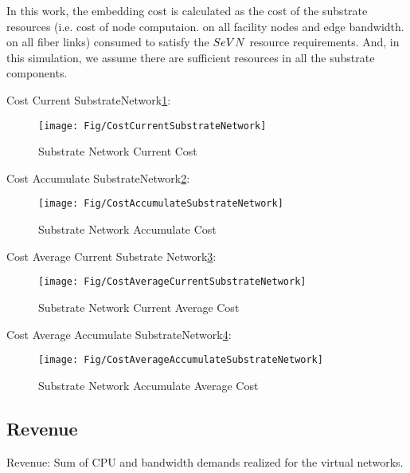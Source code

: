 In this work, the embedding cost is calculated as the cost of the substrate resources (i.e. cost of node computaion. on all facility nodes and edge bandwidth. on all fiber links) consumed to satisfy the $SeVN$ resource requirements. And, in this simulation, we assume there are sufficient resources in all the substrate components.


Cost Current SubstrateNetwork\ref{fig:CostCurrentSubstrateNetwork}:
\begin{figure}
  \centering
  \texttt{[image: Fig/CostCurrentSubstrateNetwork]}\\
  \caption{Substrate Network Current Cost}\label{fig:CostCurrentSubstrateNetwork}
\end{figure}

Cost Accumulate SubstrateNetwork\ref{fig:CostAccumulateSubstrateNetwork}:
\begin{figure}
  \centering
  \texttt{[image: Fig/CostAccumulateSubstrateNetwork]}\\
  \caption{Substrate Network Accumulate Cost}\label{fig:CostAccumulateSubstrateNetwork}
\end{figure}

Cost Average Current Substrate Network\ref{fig:CostAverageCurrentSubstrateNetwork}:
\begin{figure}
  \centering
  \texttt{[image: Fig/CostAverageCurrentSubstrateNetwork]}\\
  \caption{Substrate Network Current Average Cost}\label{fig:CostAverageCurrentSubstrateNetwork}
\end{figure}

Cost Average Accumulate SubstrateNetwork\ref{fig:CostAverageAccumulateSubstrateNetwork}:
\begin{figure}
  \centering
  \texttt{[image: Fig/CostAverageAccumulateSubstrateNetwork]}\\
  \caption{Substrate Network Accumulate Average Cost }\label{fig:CostAverageAccumulateSubstrateNetwork}
\end{figure}



\subsection{Revenue}
Revenue: Sum of CPU and bandwidth demands realized for the virtual networks.

